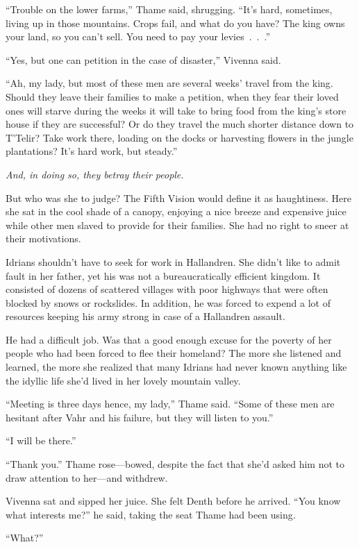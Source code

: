 “Trouble on the lower farms,” Thame said, shrugging. “It’s hard, sometimes, living up in those mountains. Crops fail, and what do you have? The king owns your land, so you can’t sell. You need to pay your levies~.~.~.”

“Yes, but one can petition in the case of disaster,” Vivenna said.

“Ah, my lady, but most of these men are several weeks’ travel from the king. Should they leave their families to make a petition, when they fear their loved ones will starve during the weeks it will take to bring food from the king’s store house if they are successful? Or do they travel the much shorter distance down to T’Telir? Take work there, loading on the docks or harvesting flowers in the jungle plantations? It’s hard work, but steady.”

\textit{And, in doing so, they betray their people.}

But who was she to judge? The Fifth Vision would define it as haughtiness. Here she sat in the cool shade of a canopy, enjoying a nice breeze and expensive juice while other men slaved to provide for their families. She had no right to sneer at their motivations.

Idrians shouldn’t have to seek for work in Hallandren. She didn’t like to admit fault in her father, yet his was not a bureaucratically efficient kingdom. It consisted of dozens of scattered villages with poor highways that were often blocked by snows or rockslides. In addition, he was forced to expend a lot of resources keeping his army strong in case of a Hallandren assault.

He had a difficult job. Was that a good enough excuse for the poverty of her people who had been forced to flee their homeland? The more she listened and learned, the more she realized that many Idrians had never known anything like the idyllic life she’d lived in her lovely mountain valley.

“Meeting is three days hence, my lady,” Thame said. “Some of these men are hesitant after Vahr and his failure, but they will listen to you.”

“I will be there.”

“Thank you.” Thame rose—bowed, despite the fact that she’d asked him not to draw attention to her—and withdrew.

Vivenna sat and sipped her juice. She felt Denth before he arrived. “You know what interests me?” he said, taking the seat Thame had been using.

“What?”

